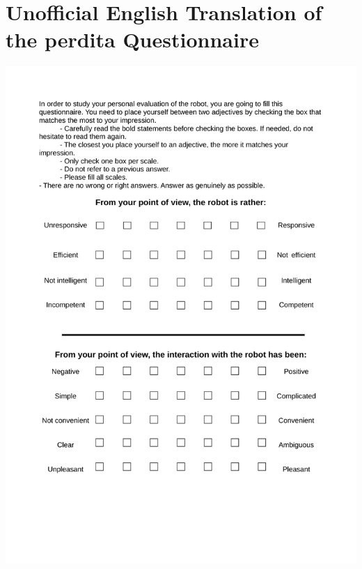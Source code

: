 \section{Unofficial English Translation of the \acrshort{perdita} Questionnaire}\label{app:perdita}
\begin{center}
	\includegraphics[page=1, width=\textwidth]{figures/annexe1/perdita_translation_en_thesis.pdf} 
\end{center}

